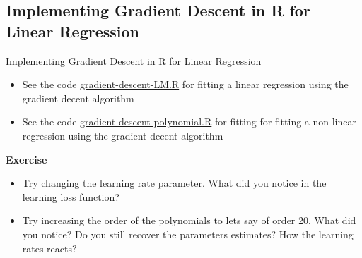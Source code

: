 \documentclass[10pt, hyperref={colorlinks = true,linkcolor = blue}]{beamer}
\begin{document}
{{\subsection{Implementing Gradient Descent in R for Linear Regression}\begin{frame}{Implementing Gradient Descent in R for Linear Regression}
\begin{itemize}
\item See the code \href{https://github.com/yadavrishikesh/Into-NNs/tree/main/code}{gradient-descent-LM.R} for fitting a linear regression using the gradient decent algorithm
\item See the code \href{https://github.com/yadavrishikesh/Into-NNs/tree/main/code}{gradient-descent-polynomial.R} for fitting for fitting a non-linear regression using the gradient decent algorithm
\end{itemize}
\textbf{Exercise}
\begin{itemize}
\item Try changing the learning rate parameter. What did you notice in the learning loss function? 
\item Try increasing the order of the polynomials to lets say of order 20. What did you notice? Do you still recover the parameters estimates? How the learning rates reacts? 
\end{itemize}
\end{frame}
}
}
\end{document}
